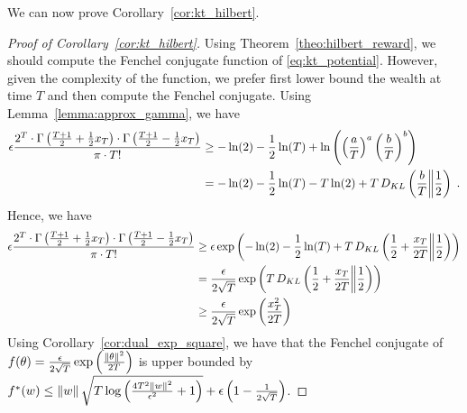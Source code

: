We can now prove Corollary~\ref{cor:kt_hilbert}.
\begin{proof}[Proof of Corollary~\ref{cor:kt_hilbert}]
Using Theorem~\ref{theo:hilbert_reward}, we should compute the Fenchel conjugate function of \eqref{eq:kt_potential}.
However, given the complexity of the function, we prefer first lower bound the wealth at time $T$ and then compute the Fenchel conjugate.
Using Lemma~\ref{lemma:approx_gamma}, we have
\begin{align*}
\epsilon  \frac{2^T \cdot \Gamma \left(\frac{T+1}{2} + \frac{1}{2} x_{T} \right) \cdot \Gamma \left(\frac{T+1}{2} - \frac{1}{2} x_{T} \right)}{\pi \cdot T!} 
&\geq -\ln(2) -\frac{1}{2} \ln(T) +\ln \left(\left( \frac{a}{T} \right)^a \left( \frac{b}{T} \right)^b\right) \\
&= -\ln(2) -\frac{1}{2} \ln(T) -T \ln (2) + T \, D_{KL}\left(\frac{b}{T}\middle\|\frac{1}{2}\right) \; .
\end{align*}
Hence, we have
\begin{align*}
\epsilon  \frac{2^T \cdot \Gamma \left(\frac{T+1}{2} + \frac{1}{2} x_{T} \right) \cdot \Gamma \left(\frac{T+1}{2} - \frac{1}{2} x_{T} \right)}{\pi \cdot T!} 
&\geq \epsilon \exp\left(-\ln(2) -\frac{1}{2} \ln(T) + T \, D_{KL}\left(\frac{1}{2}+\frac{x_T}{2T}\middle\|\frac{1}{2}\right)\right) \\
&= \frac{\epsilon}{2 \sqrt{T}} \exp\left(T \, D_{KL}\left(\frac{1}{2}+\frac{x_T}{2T}\middle\|\frac{1}{2}\right)\right) \\
&\geq \frac{\epsilon}{2 \sqrt{T}} \exp\left(\frac{x_T^2}{2T}\right)
\end{align*}
Using Corollary~\ref{cor:dual_exp_square}, we have that the Fenchel conjugate of $f(\theta)=\frac{\epsilon}{2\sqrt{T}} \exp\left(\frac{\left\|{\theta}\right\|^2}{2 T}\right)$ is upper bounded by $f^*(w) \leq \left\|{w}\right\| \sqrt{T \log \left(\frac{4 T^2 \left\|{w}\right\|^2}{\epsilon^2} +1 \right)}+\epsilon\left(1-\frac{1}{2\sqrt{T}}\right)$.
\end{proof}
